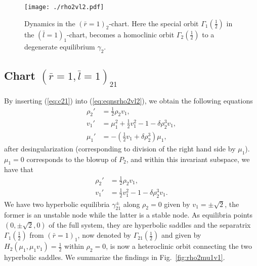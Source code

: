 \documentclass[reqno,12pt]{amsart}
\newcommand{\seclab}[1]{\label{sec:#1}}
\newcommand{\eqlab}[1]{\label{eq:#1}}
\renewcommand{\eqref}[1]{(\ref{eq:#1})}
\newcommand{\figref}[1]{Fig.~\ref{fig:#1}}
\newcommand{\figlab}[1]{\label{fig:#1}}
\numberwithin{equation}{section}
\begin{document}
\begin{figure}[h!]
 	\begin{center}
 		{\texttt{[image: ./rho2vl2.pdf]}}
 		\caption{Dynamics in the $(\bar r=1)_2$-chart. Here the special orbit $\Gamma_1\!\left(\frac12\right)$ in the $(\bar l=1)_1$-chart, becomes a homoclinic orbit $\Gamma_2\!\left(\frac12\right)$ to a degenerate equilibrium $\gamma_2$.  }\figlab{rho2vl2}
 	\end{center}
 \end{figure}
 
\subsection{Chart $(\bar r=1,\bar l=1)_{21}$}\seclab{c21}
By inserting \eqref{c21} into \eqref{eqnsrho2vl2}, we obtain the following equations
\begin{equation}\eqlab{c21eqns}
\begin{aligned}
 \rho_2' &=\frac12 \rho_2 v_1,\\
 v_1' &=\mu_1^2+\frac12 v_1^2-1-\delta \rho_2^3v_1,\\
 \mu_1'&=-\left(\frac12 v_1+\delta \rho_2^3\right)\mu_1,
\end{aligned}
\end{equation}
after desingularization (corresponding to division of the right hand side by $\mu_1$). 
$\mu_1=0$ corresponds to the blowup of $P_2$, and within this invariant subspace, we have that
\begin{equation}\eqlab{rho2v1eqns}
\begin{aligned}
  \rho_2' &= \frac12 \rho_2 v_1,\\
 v_1' &=\frac12 v_1^2-1-\delta \rho_2^3v_1.
\end{aligned}
\end{equation}
We have two hyperbolic equilibria $\gamma_{21}^\pm$ along $\rho_2=0$ given by $v_1=\pm \sqrt{2}$, the former is an unstable node while the latter is a stable node. As equilibria points $(0,\pm \sqrt{2},0)$ of the full system, they are hyperbolic saddles and the separatrix $\Gamma_1\!\left(\frac12\right)$ from $(\bar r=1)_1$, now denoted by $\Gamma_{21}\!\left(\frac12\right)$ and given by $H_2(\mu_1,\mu_1 v_1)=\frac12$ within $\rho_2=0$, is now a heteroclinic orbit connecting the two hyperbolic saddles. We summarize the findings in \figref{rho2mu1v1}.
\end{document}
